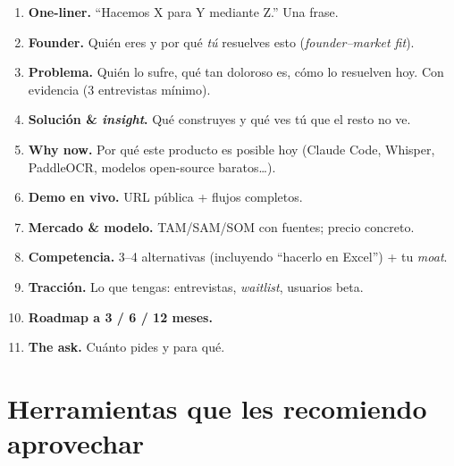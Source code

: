 \documentclass[10.5pt,a4paper]{article}
\begin{document}
\begin{enumerate}[leftmargin=1.4em,itemsep=1pt,topsep=2pt]
  \item \textbf{One-liner.} ``Hacemos X para Y mediante Z.'' Una frase.
  \item \textbf{Founder.} Qui\'en eres y por qu\'e \emph{t\'u} resuelves esto
        (\emph{founder--market fit}).
  \item \textbf{Problema.} Qui\'en lo sufre, qu\'e tan doloroso es, c\'omo lo
        resuelven hoy. Con evidencia (3 entrevistas m\'inimo).
  \item \textbf{Soluci\'on \& \emph{insight}.} Qu\'e construyes y qu\'e ves t\'u
        que el resto no ve.
  \item \textbf{Why now.} Por qu\'e este producto es posible hoy
        (Claude Code, Whisper, PaddleOCR, modelos open-source baratos\ldots).
  \item \textbf{Demo en vivo.} URL p\'ublica + flujos completos.
  \item \textbf{Mercado \& modelo.} TAM/SAM/SOM con fuentes; precio concreto.
  \item \textbf{Competencia.} 3--4 alternativas (incluyendo ``hacerlo en Excel'') + tu \emph{moat}.
  \item \textbf{Tracci\'on.} Lo que tengas: entrevistas, \emph{waitlist}, usuarios beta.
  \item \textbf{Roadmap a 3 / 6 / 12 meses.}
  \item \textbf{The ask.} Cu\'anto pides y para qu\'e.
\end{enumerate}

\section{Herramientas que les recomiendo aprovechar}
\end{document}
